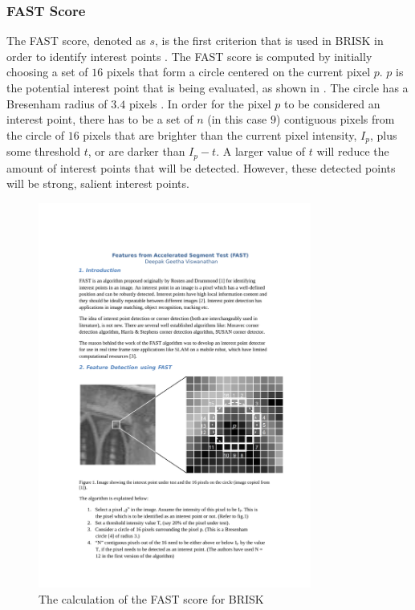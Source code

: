 \documentclass{article}
\begin{document}
\subsubsection{FAST Score}
\label{sec:fastScore}

The FAST score, denoted as $s$, is the first criterion that is used in BRISK in order to identify interest points \cite{Rosten2006}. The FAST score is computed by initially choosing a set of $16$ pixels that form a circle centered on the current pixel $p$. $p$ is the potential interest point that is being evaluated, as shown in  \cite{Rosten2006}. The circle has a Bresenham radius of $3.4$ pixels \cite{Mair2010}. In order for the pixel $p$ to be considered an interest point, there has to be a set of $n$ (in this case $9$) contiguous pixels from the circle of $16$ pixels that are brighter than the current pixel intensity, $I_p$, plus some threshold $t$, or are darker than $I_p - t$. A larger value of $t$ will reduce the amount of interest points that will be detected. However, these detected points will be strong, salient interest points. \\

\begin{figure}[h!] 
  \centering
    \includegraphics[width=0.8\textwidth]{../Drawings/methods/FASTScoreCalculation.pdf}
    \caption{The calculation of the FAST score for BRISK}
    \label{fig:fastScore}
\end{figure}
\end{document}
